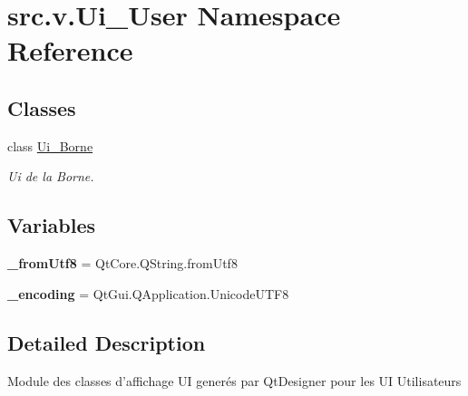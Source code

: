 \hypertarget{namespacesrc_1_1v_1_1_ui___user}{}\section{src.\+v.\+Ui\+\_\+\+User Namespace Reference}
\label{namespacesrc_1_1v_1_1_ui___user}
\subsection*{Classes}
\begin{DoxyCompactItemize}
\item 
class \hyperlink{classsrc_1_1v_1_1_ui___user_1_1_ui___borne}{Ui\+\_\+\+Borne}
\begin{DoxyCompactList}\small\item\em Ui de la Borne. \end{DoxyCompactList}\end{DoxyCompactItemize}
\subsection*{Variables}
\begin{DoxyCompactItemize}
\item 
\hypertarget{namespacesrc_1_1v_1_1_ui___user_ac95352a65f372e7572e04581e24de2c0}{}{\bfseries \+\_\+from\+Utf8} = Qt\+Core.\+Q\+String.\+from\+Utf8\label{namespacesrc_1_1v_1_1_ui___user_ac95352a65f372e7572e04581e24de2c0}

\item 
\hypertarget{namespacesrc_1_1v_1_1_ui___user_a6e0d51f8ddbf69d292facf1eff25dbf3}{}{\bfseries \+\_\+encoding} = Qt\+Gui.\+Q\+Application.\+Unicode\+U\+T\+F8\label{namespacesrc_1_1v_1_1_ui___user_a6e0d51f8ddbf69d292facf1eff25dbf3}

\end{DoxyCompactItemize}


\subsection{Detailed Description}
\begin{DoxyVerb}    Module des classes d'affichage UI generés par QtDesigner pour les UI Utilisateurs
\end{DoxyVerb}
 